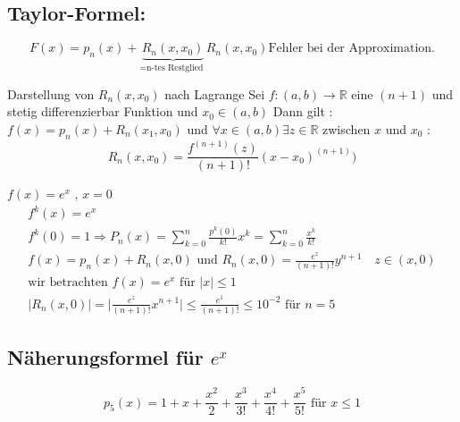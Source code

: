 \subsection{Taylor-Formel:}
\[ F(x) = p_n(x)+ \underbrace{R_n(x,x_0)}_{=  \text{n-tes Restglied }} R_n(x,x_0) \text{Fehler bei der Approximation.} \]
\begin{theorem}
Darstellung von $R_n(x,x_0)$ nach Lagrange 
Sei $f:(a,b) \rightarrow \mathbb{R}$ eine $(n+1)$ und stetig differenzierbar Funktion und $x_0 \in (a,b)$
Dann gilt : $f(x)= p_n(x)+ R_n(x_1 , x_0)$ und $\forall x \in (a,b) \exists z \in \mathbb{R}$ zwischen $x$ und $x_0$ : \\
   \[ R_n(x , x_0) = \frac{f^{(n+1)}(z)}{(n+1)!}(x-x_0)^{(n+1)}) \]
\end{theorem}
\begin{example}
$f(x)=e^x$ , $x = 0$
\begin{gather*}
f^k(x)= e^x\\
f^k(0)= 1 \Rightarrow P_n(x) = \sum_{k=0}^{n}{\frac{p^k(0)}{k!}x^k} = \sum_{k=0}^{n}{\frac{x^k}{k!}}\\
f(x)= p_n(x) + R_n(x,0) \text{ und } R_n(x,0) = \frac{e^z}{(n+1)!} y^{n+1} \quad z \in (x,0)\\
\text{wir betrachten } f(x) = e^x \text{ für } |x| \leq 1\\
\big|R_n(x,0)|=|\frac{e^z}{(n+1)!}x^{n+1}| \leq \frac{e^1}{(n+1)!} \leq 10^{-2} \text{ für } n = 5
\end{gather*}
\subsection{Näherungsformel für $e^x$}
\[ p_5 (x) = 1 + x + \frac{x^2}{2} + \frac{x^3}{3!} + \frac{x^4}{4!} + \frac{x^5}{5!} \text{ für } x \leq 1 \]
\end{example}
